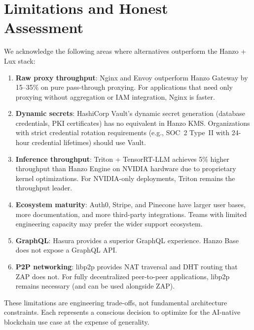 \section{Limitations and Honest Assessment}

\label{sec:limitations}

We acknowledge the following areas where alternatives outperform the Hanzo + Lux stack:

\begin{enumerate}
    \item \textbf{Raw proxy throughput}: Nginx and Envoy outperform Hanzo Gateway by 15--35\% on pure pass-through proxying. For applications that need only proxying without aggregation or IAM integration, Nginx is faster.

    \item \textbf{Dynamic secrets}: HashiCorp Vault's dynamic secret generation (database credentials, PKI certificates) has no equivalent in Hanzo KMS. Organizations with strict credential rotation requirements (e.g., SOC~2 Type~II with 24-hour credential lifetimes) should use Vault.

    \item \textbf{Inference throughput}: Triton + TensorRT-LLM achieves 5\% higher throughput than Hanzo Engine on NVIDIA hardware due to proprietary kernel optimizations. For NVIDIA-only deployments, Triton remains the throughput leader.

    \item \textbf{Ecosystem maturity}: Auth0, Stripe, and Pinecone have larger user bases, more documentation, and more third-party integrations. Teams with limited engineering capacity may prefer the wider support ecosystem.

    \item \textbf{GraphQL}: Hasura provides a superior GraphQL experience. Hanzo Base does not expose a GraphQL API.

    \item \textbf{P2P networking}: libp2p provides NAT traversal and DHT routing that ZAP does not. For fully decentralized peer-to-peer applications, libp2p remains necessary (and can be used alongside ZAP).
\end{enumerate}

These limitations are engineering trade-offs, not fundamental architecture constraints. Each represents a conscious decision to optimize for the AI-native blockchain use case at the expense of generality.

